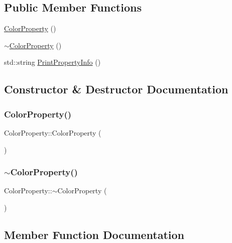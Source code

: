 \subsection*{Public Member Functions}
\begin{DoxyCompactItemize}
\item 
\mbox{\hyperlink{class_color_property_aa1200fe8c639598042a0650d20fa6156}{Color\+Property}} ()
\item 
\mbox{\hyperlink{class_color_property_af2e9f36cc1dce46739d63b455364925a}{$\sim$\+Color\+Property}} ()
\item 
std\+::string \mbox{\hyperlink{class_color_property_a1a04f62489d3f17f2984fdafa7db3f52}{Print\+Property\+Info}} ()
\end{DoxyCompactItemize}


\subsection{Constructor \& Destructor Documentation}
\mbox{\label{class_color_property_aa1200fe8c639598042a0650d20fa6156}} 
\subsubsection{\texorpdfstring{ColorProperty()}{ColorProperty()}}
{\footnotesize\ttfamily Color\+Property\+::\+Color\+Property (\begin{DoxyParamCaption}{ }\end{DoxyParamCaption})}

\mbox{\label{class_color_property_af2e9f36cc1dce46739d63b455364925a}} 
\subsubsection{\texorpdfstring{$\sim$ColorProperty()}{~ColorProperty()}}
{\footnotesize\ttfamily Color\+Property\+::$\sim$\+Color\+Property (\begin{DoxyParamCaption}{ }\end{DoxyParamCaption})}



\subsection{Member Function Documentation}
\mbox{\label{class_color_property_a1a04f62489d3f17f2984fdafa7db3f52}} 
